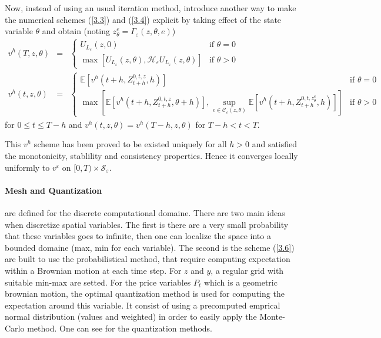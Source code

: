 \documentclass[a4paper,10pt]{article}
\begin{document}
\par Now, instead of using an usual iteration method, \cite{GMP} introduce another way to make the numerical schemes (\ref{3.3}) and (\ref{3.4}) explicit by taking effect of the state variable $\theta$ and obtain (noting $z^e_\theta = \Gamma_\varepsilon (z, \theta, e)$)
\begin{eqnarray}
\label{3.5}
{v^h}(T,z,\theta ) &=& \left\{ \begin{array}{ll}
{U_{{L_\varepsilon }}}\left( {z,0} \right) & \textrm{if $\theta = 0$}\\
\max \left[ {{U_{{L_\varepsilon }}}\left( {z,\theta } \right),{\mathcal{H}_\varepsilon }{U_{{L_\varepsilon }}}\left( {z,\theta } \right)} \right] & \textrm{if $\theta > 0$}
\end{array} \right.
\\
\label{3.6}
{v^h}(t,z,\theta ) &=& \left\{ \begin{array}{ll}
\mathbb{E}\left[ {{v^h}\left( {t + h,Z_{t + h}^{0,t,z},h} \right)} \right] & \textrm{if $\theta = 0$}\\
\max \left[ {\mathbb{E}\left[ {{v^h}\left( {t + h,Z_{t + h}^{0,t,z},\theta  + h} \right)} \right],\mathop {\sup }\limits_{e \in {\mathcal{C}_\varepsilon }\left( {z,\theta } \right)} \mathbb{E}\left[ {{v^h}\left( {t + h,Z_{t + h}^{0,t,z_\theta ^e},h} \right)} \right]} \right] & \textrm{if $\theta > 0$}
\end{array} \right.
\end{eqnarray}
for $0 \le t \le T-h$ and $v^h(t,z,\theta) = v^h(T-h,z,\theta) $ for $T-h < t < T$.

\par This $v^h$ scheme has been proved to be existed uniquely for all $h > 0$ and satisfied the monotonicity, stablility and consistency properties. Hence it converges locally uniformly to $v^\varepsilon$ on $[0, T) \times \mathcal{S}_{\varepsilon}$.

\paragraph{Mesh and Quantization} are defined for the discrete computational domaine. There are two main ideas when discretize spatial variables. The first is there are a very small probability that these variables goes to infinite, then one can localize the space into a bounded domaine (max, min for each variable). The second is the scheme (\ref{3.6}) are built to use the probabilistical method, that require computing expectation within a Brownian motion at each time step. For $z$ and $y$, a regular grid with suitable min-max are setted. For the price variables $P_t$ which is a geometric brownian motion, the optimal quantization method is used for computing the expectation around this variable. It consist of using a precomputed emprical normal distribution (values and weighted) in order to easily apply the Monte-Carlo method. One can see \cite{GP}\cite{GPHP} for the quantization methods.    
\end{document}
